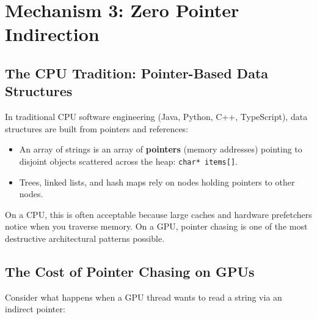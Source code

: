 \documentclass[a4paper,11pt]{article}
\begin{document}
\newpage

\section{Mechanism 3: Zero Pointer Indirection}

\subsection{The CPU Tradition: Pointer-Based Data Structures}

In traditional CPU software engineering (Java, Python, C++, TypeScript), data structures are built from pointers and references:
\begin{itemize}
  \item An array of strings is an array of \textbf{pointers} (memory addresses) pointing to disjoint objects scattered across the heap: \texttt{char* items[]}.
  \item Trees, linked lists, and hash maps rely on nodes holding pointers to other nodes.
\end{itemize}

On a CPU, this is often acceptable because large caches and hardware prefetchers notice when you traverse memory. On a GPU, pointer chasing is one of the most destructive architectural patterns possible.

\subsection{The Cost of Pointer Chasing on GPUs}

Consider what happens when a GPU thread wants to read a string via an indirect pointer:
\end{document}
